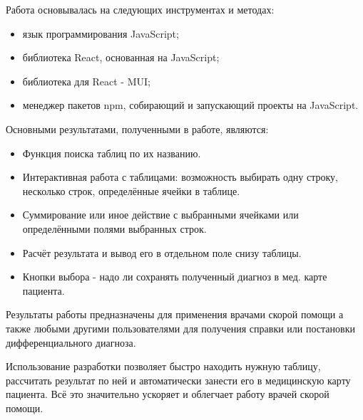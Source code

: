 Работа основывалась на следующих инструментах и методах:
\begin{itemize}
\item язык программирования JavaScript;
\item библиотека React, основанная на  JavaScript;
\item библиотека для React - MUI;
\item менеджер пакетов npm, собирающий и запускающий проекты на JavaScript.
\end{itemize}

Основными результатами, полученными в работе, являются:
\begin{itemize}
\item Функция поиска таблиц по их названию.
\item Интерактивная работа с таблицами: возможность выбирать одну строку, несколько строк, определённые ячейки в таблице.
\item Суммирование или иное действие с выбранными ячейками или определёнными полями выбранных строк.
\item Расчёт результата и вывод его в отдельном поле снизу таблицы.
\item Кнопки выбора - надо ли сохранять полученный диагноз в мед. карте пациента.
\end{itemize}

Результаты работы предназначены для применения врачами скорой помощи а также любыми другими пользователями для получения справки или постановки дифференциального диагноза. 

Использование разработки позволяет быстро находить нужную таблицу, рассчитать результат по ней и автоматически занести его в медицинскую карту пациента. Всё это значительно ускоряет и облегчает работу врачей скорой помощи.